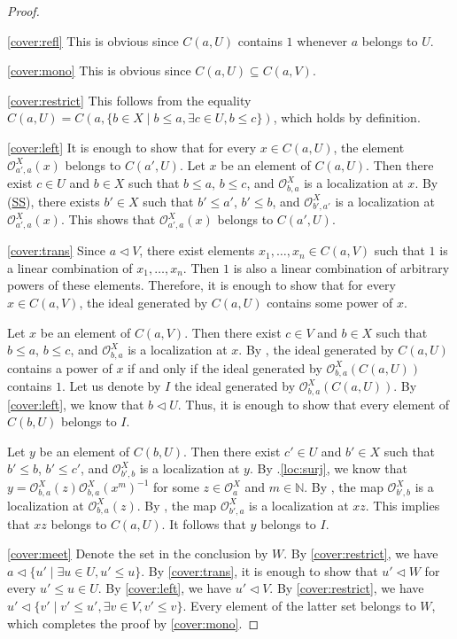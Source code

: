 \documentclass[reqno]{amsart}
\newcommand{\axref}[1]{(\hyperref[ax:#1]{#1})}
\theoremstyle{definition}
\theoremstyle{remark}
\numberwithin{figure}{section}
\newcommand{\cover}{\triangleleft}
\begin{document}
\begin{proof}
\

\eqref{cover:refl} This is obvious since $C(a,U)$ contains $1$ whenever $a$ belongs to $U$.

\eqref{cover:mono} This is obvious since $C(a,U) \subseteq C(a,V)$.

\eqref{cover:restrict} This follows from the equality $C(a,U) = C(a, \{ b \in X \mid b \leq a, \exists c \in U, b \leq c \})$, which holds by definition.

\eqref{cover:left} It is enough to show that for every $x \in C(a,U)$, the element $\mathcal{O}^X_{a',a}(x)$ belongs to $C(a',U)$.
Let $x$ be an element of $C(a,U)$.
Then there exist $c \in U$ and $b \in X$ such that $b \leq a$, $b \leq c$, and $\mathcal{O}^X_{b,a}$ is a localization at $x$.
By \axref{SS}, there exists $b' \in X$ such that $b' \leq a'$, $b' \leq b$, and $\mathcal{O}^X_{b',a'}$ is a localization at $\mathcal{O}^X_{a',a}(x)$.
This shows that $\mathcal{O}^X_{a',a}(x)$ belongs to $C(a',U)$.

\eqref{cover:trans} Since $a \cover V$, there exist elements $x_1, \ldots, x_n \in C(a,V)$ such that $1$ is a linear combination of $x_1, \ldots, x_n$.
Then $1$ is also a linear combination of arbitrary powers of these elements.
Therefore, it is enough to show that for every $x \in C(a,V)$, the ideal generated by $C(a,U)$ contains some power of $x$.

Let $x$ be an element of $C(a,V)$.
Then there exist $c \in V$ and $b \in X$ such that $b \leq a$, $b \leq c$, and $\mathcal{O}^X_{b,a}$ is a localization at $x$.
By , the ideal generated by $C(a,U)$ contains a power of $x$ if and only if the ideal generated by $\mathcal{O}^X_{b,a}(C(a,U))$ contains $1$.
Let us denote by $I$ the ideal generated by $\mathcal{O}^X_{b,a}(C(a,U))$.
By \eqref{cover:left}, we know that $b \cover U$.
Thus, it is enough to show that every element of $C(b,U)$ belongs to $I$.

Let $y$ be an element of $C(b,U)$.
Then there exist $c' \in U$ and $b' \in X$ such that $b' \leq b$, $b' \leq c'$, and $\mathcal{O}^X_{b',b}$ is a localization at $y$.
By .\eqref{loc:surj}, we know that $y = \mathcal{O}^X_{b,a}(z) \mathcal{O}^X_{b,a}(x^m)^{-1}$ for some $z \in \mathcal{O}^X_a$ and $m \in \mathbb{N}$.
By , the map $\mathcal{O}^X_{b',b}$ is a localization at $\mathcal{O}^X_{b,a}(z)$.
By , the map $\mathcal{O}^X_{b',a}$ is a localization at $x z$.
This implies that $x z$ belongs to $C(a,U)$.
It follows that $y$ belongs to $I$.

\eqref{cover:meet} Denote the set in the conclusion by $W$.
By \eqref{cover:restrict}, we have $a \cover \{ u' \mid \exists u \in U, u' \leq u \}$.
By \eqref{cover:trans}, it is enough to show that $u' \cover W$ for every $u' \leq u \in U$.
By \eqref{cover:left}, we have $u' \cover V$.
By \eqref{cover:restrict}, we have $u' \cover \{ v' \mid v' \leq u', \exists v \in V, v' \leq v \}$.
Every element of the latter set belongs to $W$, which completes the proof by \eqref{cover:mono}.
\end{proof}
\end{document}
